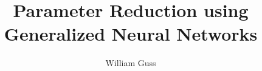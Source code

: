 \documentclass[final]{beamer}
\title{Parameter Reduction using Generalized Neural Networks} %
\author{William Guss} %
\institute{Machine Learning at Berkeley} %
\newlength{\sepwid}
\newlength{\onecolwid}
\newlength{\twocolwid}
\begin{document}

\setlength{\belowcaptionskip}{2ex} %
\setlength\belowdisplayshortskip{2ex} %

\begin{frame}[t] %

  \begin{columns}[t]
    \begin{column}{\sepwid}\end{column} %

    \begin{column}{\onecolwid} %
      
    \end{column} %

    \begin{column}{\sepwid}\end{column} %

    \begin{column}{\twocolwid} %
      
    \end{column}

    \begin{column}{\sepwid}\end{column} %

    \begin{column}{\onecolwid} %
      
    \end{column} %


  \end{columns}


\end{frame} %
\end{document}
